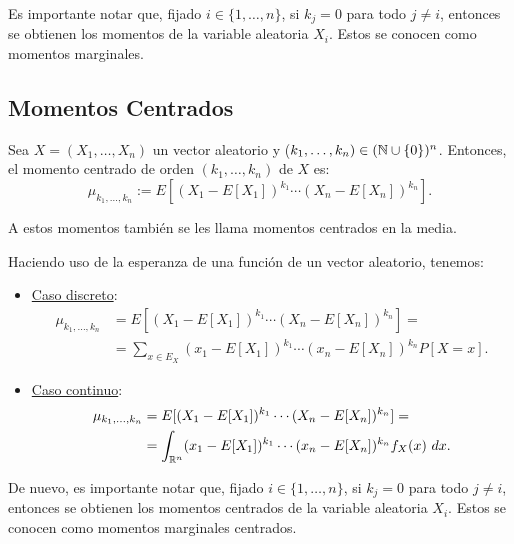 Es importante notar que, fijado $i\in \{1,\dots,n\}$, si $k_j=0$ para todo $j\neq i$, entonces se obtienen los momentos de la variable aleatoria $X_i$. Estos se conocen como momentos marginales.

\subsection{Momentos Centrados}

\begin{definicion}
    Sea $X=(X_1,\dots,X_n)$ un vector aleatorio y ($k_1,\dots,k_n)\in (\mathbb{N}\cup \{0\})^n$. Entonces, el momento centrado de orden $(k_1,\dots,k_n)$ de $X$ es:
    \begin{equation*}
        \mu_{k_1,\dots,k_n} := E[(X_1-E[X_1])^{k_1}\cdots (X_n-E[X_n])^{k_n}].
    \end{equation*}

    A estos momentos también se les llama momentos centrados en la media.
\end{definicion}

Haciendo uso de la esperanza de una función de un vector aleatorio, tenemos:
\begin{itemize}
    \item \ul{Caso discreto}:
    \begin{align*}
        \mu_{k_1,\dots,k_n}&=E[(X_1-E[X_1])^{k_1}\cdots (X_n-E[X_n])^{k_n}] =\\&= \sum_{x\in E_X} (x_1-E[X_1])^{k_1}\cdots (x_n-E[X_n])^{k_n}
        P[X=x].
    \end{align*}

    \item \ul{Caso continuo}:
    \begin{align*}
        \mu_{k_1,\dots,k_n}&=E[(X_1-E[X_1])^{k_1}\cdots (X_n-E[X_n])^{k_n}] =\\&= \int_{\mathbb{R}^n} (x_1-E[X_1])^{k_1}\cdots (x_n-E[X_n])^{k_n} f_X(x)~d x.
    \end{align*}
\end{itemize}

De nuevo, es importante notar que, fijado $i\in \{1,\dots,n\}$, si $k_j=0$ para todo $j\neq i$, entonces se obtienen los momentos centrados de la variable aleatoria $X_i$. Estos se conocen como momentos marginales centrados.\\

